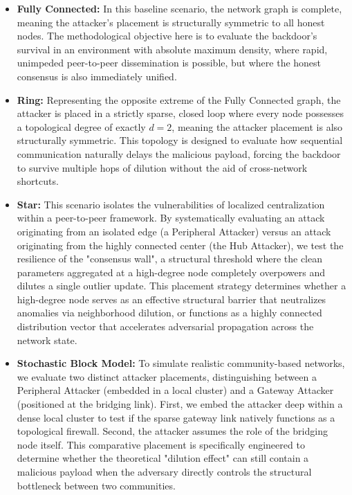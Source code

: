 \begin{itemize}
    \item \textbf{Fully Connected:} In this baseline scenario, the network graph is complete, meaning the attacker's placement is structurally symmetric to all honest nodes. The methodological objective here is to evaluate the backdoor's survival in an environment with absolute maximum density, where rapid, unimpeded peer-to-peer dissemination is possible, but where the honest consensus is also immediately unified.
    
    \item \textbf{Ring:} Representing the opposite extreme of the Fully Connected graph, the attacker is placed in a strictly sparse, closed loop where every node possesses a topological degree of exactly $d=2$, meaning the attacker placement is also structurally symmetric. This topology is designed to evaluate how sequential communication naturally delays the malicious payload, forcing the backdoor to survive multiple hops of dilution without the aid of cross-network shortcuts.
    
    \item \textbf{Star:} This scenario isolates the vulnerabilities of localized centralization within a peer-to-peer framework. By systematically evaluating an attack originating from an isolated edge (a Peripheral Attacker) versus an attack originating from the highly connected center (the Hub Attacker), we test the resilience of the "consensus wall", a structural threshold where the clean parameters aggregated at a high-degree node completely overpowers and dilutes a single outlier update. This placement strategy determines whether a high-degree node serves as an effective structural barrier that neutralizes anomalies via neighborhood dilution, or functions as a highly connected distribution vector that accelerates adversarial propagation across the network state.
    
    \item \textbf{Stochastic Block Model:} To simulate realistic community-based networks, we evaluate two distinct attacker placements, distinguishing between a Peripheral Attacker (embedded in a local cluster) and a Gateway Attacker (positioned at the bridging link). First, we embed the attacker deep within a dense local cluster to test if the sparse gateway link natively functions as a topological firewall. Second, the attacker assumes the role of the bridging node itself. This comparative placement is specifically engineered to determine whether the theoretical "dilution effect" can still contain a malicious payload when the adversary directly controls the structural bottleneck between two communities.
\end{itemize}

